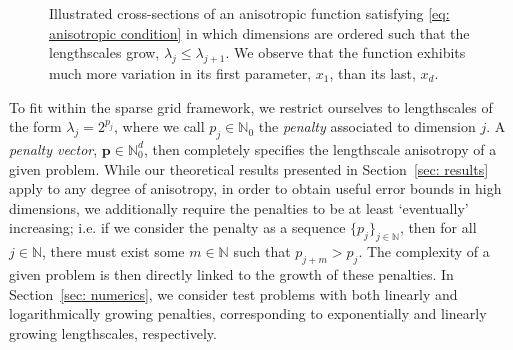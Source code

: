 \documentclass[pdflatex,sn-mathphys-num]{sn-jnl}%
\theoremstyle{thmstyleone}%
\theoremstyle{thmstyletwo}%
\theoremstyle{thmstylethree}%
\begin{document}
\begin{figure}[h]
    \centering
    \vspace{3mm}
    \caption{Illustrated cross-sections of an anisotropic function satisfying \eqref{eq: anisotropic condition} in which dimensions are ordered such that the lengthscales grow, \(\lambda_j\leq\lambda_{j+1}\). We observe that the function exhibits much more variation in its first parameter, \(x_1\), than its last, \(x_d\).}
    \label{fig: anisotropic function}
\end{figure}


To fit within the sparse grid framework, we restrict ourselves to lengthscales of the form \(\lambda_j=2^{p_j}\), where we call \(p_j\in\mathbb{N}_0\) the \textit{penalty} associated to dimension \(j\). A \textit{penalty vector}, \(\mathbf{p}\in\mathbb{N}_0^d\), then completely specifies the lengthscale anisotropy of a given problem. While our theoretical results presented in Section~\ref{sec: results} apply to any degree of anisotropy, in order to obtain useful error bounds in high dimensions, we additionally require the penalties to be at least `eventually' increasing; i.e. if we consider the penalty as a sequence \(\{p_j\}_{j\in\mathbb{N}}\), then for all \(j\in\mathbb{N}\), there must exist some \(m\in\mathbb{N}\) such that \(p_{j+m}>p_j\). The complexity of a given problem is then directly linked to the growth of these penalties. In Section~\ref{sec: numerics}, we consider test problems with both linearly and logarithmically growing penalties, corresponding to exponentially and linearly growing lengthscales, respectively.
\end{document}
